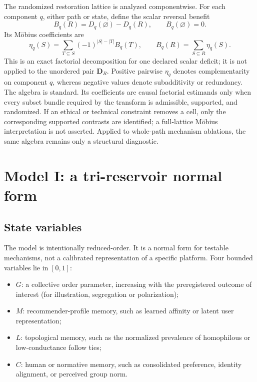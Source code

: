 \documentclass[pdflatex,sn-mathphys-num]{sn-jnl}
\begin{document}
The randomized restoration lattice is analyzed componentwise. For each component $q$, either path or state, define the scalar reversal benefit
\begin{equation}
B_q(R)=D_q(\varnothing)-D_q(R),
\qquad B_q(\varnothing)=0.
\end{equation}
Its M\"obius coefficients are
\begin{equation}
\eta_q(S)=
\sum_{T\subseteq S}(-1)^{|S|-|T|}B_q(T),
\qquad
B_q(R)=\sum_{S\subseteq R}\eta_q(S).
\label{eq:mobius}
\end{equation}
This is an exact factorial decomposition for one declared scalar deficit; it is not applied to the unordered pair $\bm D_R$. Positive pairwise $\eta_q$ denotes complementarity on component $q$, whereas negative values denote subadditivity or redundancy. The algebra is standard. Its coefficients are causal factorial estimands only when every subset bundle required by the transform is admissible, supported, and randomized. If an ethical or technical constraint removes a cell, only the corresponding supported contrasts are identified; a full-lattice M\"obius interpretation is not asserted. Applied to whole-path mechanism ablations, the same algebra remains only a structural diagnostic.

\section{Model I: a tri-reservoir normal form}

\subsection{State variables}

The model is intentionally reduced-order. It is a normal form for testable mechanisms, not a calibrated representation of a specific platform. Four bounded variables lie in $[0,1]$:
\begin{itemize}
  \item $G$: a collective order parameter, increasing with the preregistered outcome of interest (for illustration, segregation or polarization);
  \item $M$: recommender-profile memory, such as learned affinity or latent user representation;
  \item $L$: topological memory, such as the normalized prevalence of homophilous or low-conductance follow ties;
  \item $C$: human or normative memory, such as consolidated preference, identity alignment, or perceived group norm.
\end{itemize}
\end{document}
